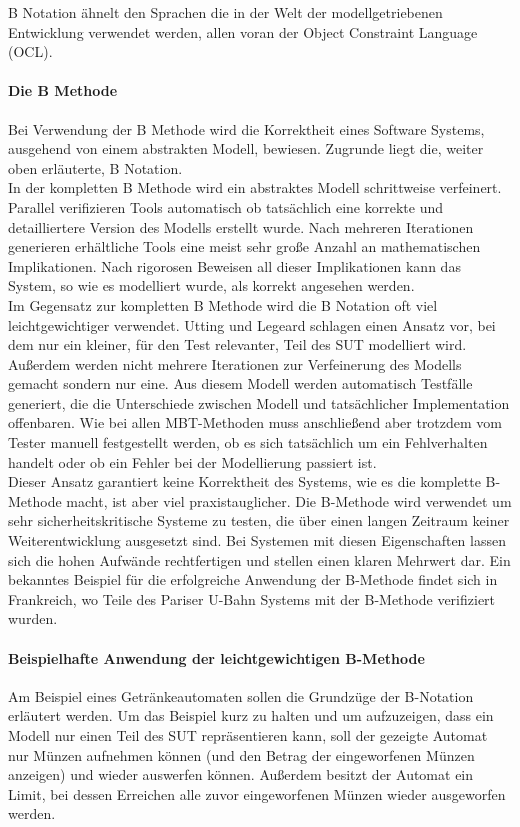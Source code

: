 B Notation ähnelt den Sprachen die in der Welt der modellgetriebenen Entwicklung verwendet werden, allen voran der Object Constraint Language (OCL). 

\paragraph{Die B Methode}
\label{sec:bmethod}
Bei Verwendung der B Methode wird die Korrektheit eines Software Systems, ausgehend von einem abstrakten Modell, bewiesen. Zugrunde liegt die, weiter oben erläuterte, B Notation.\\
In der kompletten B Methode wird ein abstraktes Modell schrittweise verfeinert. Parallel verifizieren Tools automatisch ob tatsächlich eine korrekte und detailliertere Version des Modells erstellt wurde. Nach mehreren Iterationen generieren erhältliche Tools eine meist sehr große Anzahl an mathematischen Implikationen. Nach rigorosen Beweisen all dieser Implikationen kann das System, so wie es modelliert wurde, als korrekt angesehen werden.\\
Im Gegensatz zur kompletten B Methode wird die B Notation oft viel leichtgewichtiger verwendet. Utting und Legeard\cite{utting_practical_2007} schlagen einen Ansatz vor, bei dem nur ein kleiner, für den Test relevanter, Teil des SUT modelliert wird. Außerdem werden nicht mehrere Iterationen zur Verfeinerung des Modells gemacht sondern nur eine. Aus diesem Modell werden automatisch Testfälle generiert, die die Unterschiede zwischen Modell und tatsächlicher Implementation offenbaren. Wie bei allen MBT-Methoden muss anschließend aber trotzdem vom Tester manuell festgestellt werden, ob es sich tatsächlich um ein Fehlverhalten handelt oder ob ein Fehler bei der Modellierung passiert ist.\\
Dieser Ansatz garantiert keine Korrektheit des Systems, wie es die komplette B-Methode macht, ist aber viel praxistauglicher. Die B-Methode wird verwendet um sehr sicherheitskritische Systeme zu testen, die über einen langen Zeitraum keiner Weiterentwicklung ausgesetzt sind. Bei Systemen mit diesen Eigenschaften lassen sich die hohen Aufwände rechtfertigen und stellen einen klaren Mehrwert dar. Ein bekanntes Beispiel für die erfolgreiche Anwendung der B-Methode findet sich in Frankreich, wo Teile des Pariser U-Bahn Systems mit der B-Methode verifiziert wurden. \cite{lecomte_formal_2007}

\paragraph{Beispielhafte Anwendung der leichtgewichtigen B-Methode}
Am Beispiel eines Getränkeautomaten sollen die Grundzüge der B-Notation erläutert werden. Um das Beispiel kurz zu halten und um aufzuzeigen, dass ein Modell nur einen Teil des SUT repräsentieren kann, soll der gezeigte Automat nur Münzen aufnehmen können (und den Betrag der eingeworfenen Münzen anzeigen) und wieder auswerfen können. Außerdem besitzt der Automat ein Limit, bei dessen Erreichen alle zuvor eingeworfenen Münzen wieder ausgeworfen werden.

